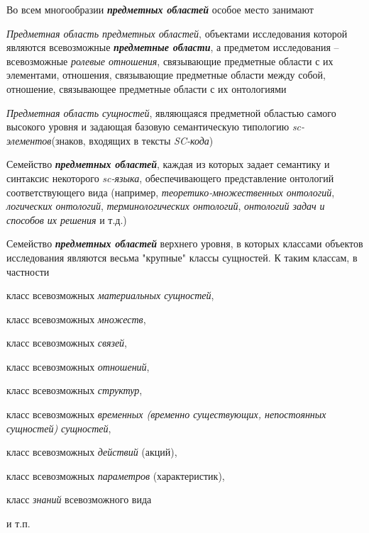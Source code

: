 \begin{SCn}
{Во всем многообразии \textbf{\textit{предметных областей}} особое место занимают
\begin{scnitemize}
    \item \textit{Предметная область предметных областей}, объектами исследования которой являются всевозможные \textbf{\textit{предметные области}}, а предметом исследования – всевозможные \textit{ролевые отношения}, связывающие предметные области с их элементами, отношения, связывающие предметные области между собой, отношение, связывающее предметные области с их онтологиями
    \item \textit{Предметная область сущностей}, являющаяся предметной областью самого высокого уровня и задающая базовую семантическую типологию \textit{sc-элементов}(знаков, входящих в тексты \textit{SC-кода})
    \item Семейство \textbf{\textit{предметных областей}}, каждая из которых задает семантику и синтаксис некоторого \textit{sc-языка}, обеспечивающего представление онтологий соответствующего вида (например, \textit{теоретико-множественных онтологий}, \textit{логических онтологий}, \textit{терминологических онтологий}, \textit{онтологий задач и способов их решения} и т.д.)
    \item Семейство \textbf{\textit{предметных областей}} верхнего уровня, в которых классами объектов исследования являются весьма "крупные"{} классы сущностей. К таким классам, в частности
    
    \begin{scnitemizeii}
        \item класс всевозможных \textit{материальных сущностей},
        \item класс всевозможных \textit{множеств},
        \item класс всевозможных \textit{связей},
        \item класс всевозможных \textit{отношений},
        \item класс всевозможных \textit{структур},
        \item класс всевозможных \textit{временных (временно существующих, непостоянных сущностей) сущностей},
        \item класс всевозможных \textit{действий} (акций),
        \item класс всевозможных \textit{параметров} (характеристик),
        \item класс \textit{знаний} всевозможного вида 
        \item и т.п.
    \end{scnitemizeii}
\end{scnitemize}


}
\end{SCn}
